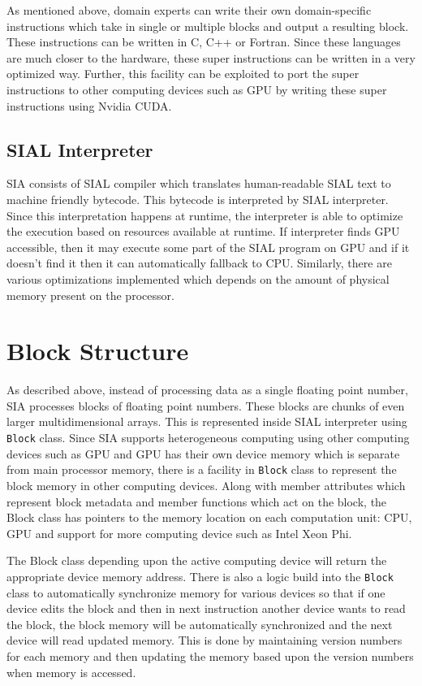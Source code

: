 As mentioned above, domain experts can write their own domain-specific
instructions which take in single or multiple blocks and output a resulting block. These
instructions can be written in C, C++ or Fortran. Since these languages are much
closer to the hardware, these super instructions can be written in a very
optimized way. Further, this facility can be exploited to port the super instructions to
other computing devices such as GPU by writing these super instructions using
Nvidia CUDA.

\subsection{SIAL Interpreter}
SIA consists of SIAL compiler which translates human-readable SIAL text to
machine friendly bytecode. This bytecode is interpreted by SIAL interpreter.
Since this interpretation happens at runtime, the interpreter is able to optimize the
execution based on resources available at runtime. If interpreter finds GPU
accessible, then it may execute some part of the SIAL program on GPU and if it
doesn't find it then it can automatically fallback to CPU. Similarly, there are
various optimizations implemented which depends on the amount of physical memory
present on the processor.

\section{Block Structure}
As described above, instead of processing data as a single floating point
number, SIA processes blocks of floating point numbers. These blocks are chunks
of even larger multidimensional arrays. This is represented inside SIAL
interpreter using \texttt{Block} class. Since SIA supports heterogeneous computing
using other computing devices such as GPU and GPU has their own device memory
which is separate from main processor memory, there is a facility in
\texttt{Block} class to represent the block memory in other
computing devices. Along with member attributes which represent block metadata
and member functions which act on the block, the Block class has pointers to
the memory location on each computation unit: CPU, GPU and support for more
computing device such as Intel Xeon Phi.

The Block class depending upon the active computing device will return the
appropriate device memory address. There is also a logic build into the \texttt{Block}
class to automatically synchronize memory for various devices so that if one
device edits the block and then in next instruction another device wants
to read the block, the block memory will be automatically synchronized and the
next device will read updated memory. This is done by maintaining version numbers
for each memory and then updating the memory based upon the version numbers when
memory is accessed.

